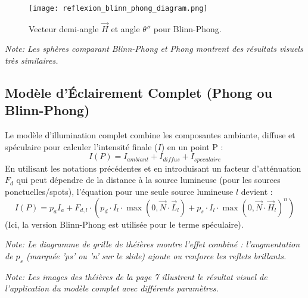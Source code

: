 \documentclass{article}
\begin{document}
\begin{figure}[H]
\centering
\texttt{[image: reflexion\_blinn\_phong\_diagram.png]}
\caption{Vecteur demi-angle $\vec{H}$ et angle $\theta''$ pour Blinn-Phong.}
\label{fig:reflexion_blinn_phong_diagram}
\end{figure}

\textit{Note: Les sphères comparant Blinn-Phong et Phong montrent des résultats visuels très similaires.}

\subsection{Modèle d'Éclairement Complet (Phong ou Blinn-Phong)}
Le modèle d'illumination complet combine les composantes ambiante, diffuse et spéculaire pour calculer l'intensité finale ($I$) en un point P :
\[ I(P) = I_{ambiant} + I_{diffus} + I_{speculaire} \]
En utilisant les notations précédentes et en introduisant un facteur d'atténuation $F_d$ qui peut dépendre de la distance à la source lumineuse (pour les sources ponctuelles/spots), l'équation pour une seule source lumineuse $l$ devient :
\[ I(P) = p_a I_a + F_{d,l} \cdot (p_d \cdot I_l \cdot \max(0, \vec{N} \cdot \vec{L}_l) + p_s \cdot I_l \cdot \max(0, \vec{N} \cdot \vec{H}_l)^n) \]
(Ici, la version Blinn-Phong est utilisée pour le terme spéculaire).

\textit{Note: Le diagramme de grille de théières montre l'effet combiné : l'augmentation de $p_s$ (marquée 'ps' ou 'n' sur le slide) ajoute ou renforce les reflets brillants.}

\textit{Note: Les images des théières de la page 7 illustrent le résultat visuel de l'application du modèle complet avec différents paramètres.}
\end{document}
